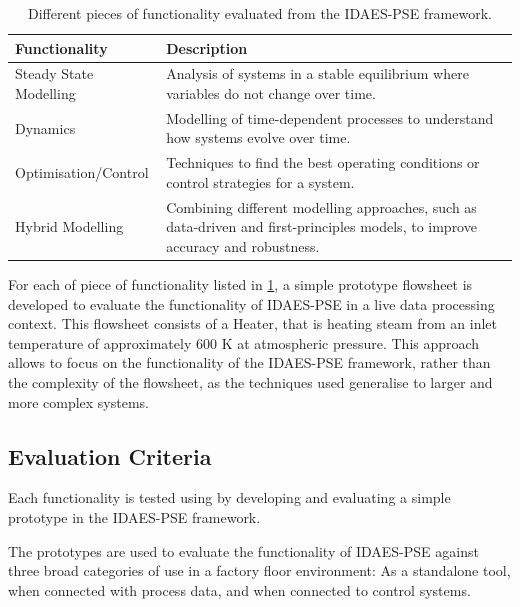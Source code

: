 \documentclass[12pt]{article}
\begin{document}
\begin{table}[h]
    \centering
    \begin{tabular}{|l|p{10cm}|}
        \hline
        \textbf{Functionality} & \textbf{Description} \\
        \hline
        Steady State Modelling & Analysis of systems in a stable equilibrium where variables do not change over time. \\
        \hline
        Dynamics & Modelling of time-dependent processes to understand how systems evolve over time. \\
        \hline
        Optimisation/Control & Techniques to find the best operating conditions or control strategies for a system. \\
        \hline
        Hybrid Modelling & Combining different modelling approaches, such as data-driven and first-principles models, to improve accuracy and robustness. \\
        \hline
    \end{tabular}
    \caption{Different pieces of functionality evaluated from the IDAES-PSE framework.}
    \label{tab:functionality}
\end{table}

For each of piece of functionality listed in \cref{tab:functionality}, a simple prototype flowsheet is developed to evaluate the functionality of IDAES-PSE in a live data processing context. This flowsheet consists of a Heater, that is heating steam from an inlet temperature of approximately 600 K at atmospheric pressure. This approach allows to focus on the functionality of the IDAES-PSE framework, rather than the complexity of the flowsheet, as the techniques used generalise to larger and more complex systems.


\subsection{Evaluation Criteria}

Each functionality is tested using by developing and evaluating a simple prototype in the IDAES-PSE framework. 

The prototypes are used to evaluate the functionality of IDAES-PSE against three broad categories of use in a factory floor environment: As a standalone tool, when connected with process data, and when connected to control systems. 
\end{document}
